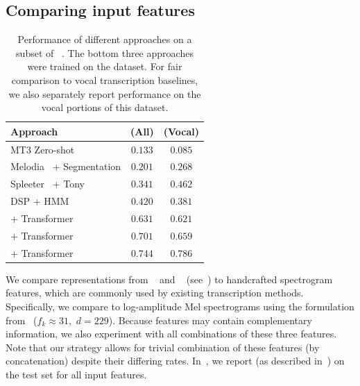 \subsection{Comparing input features}
\label{sec:exp1}

\begin{table}[t]
    \centering
    \begin{tabular}{lcc}
\toprule
Approach & \fone{} (All) & \fone{} (Vocal)\\
\midrule
MT3 Zero-shot~\cite{gardner2021mt3} & $0.133$ & $0.085$ \\
Melodia~\cite{salamon2014melody} + Segmentation & $0.201$ & $0.268$ \\
Spleeter~\cite{hennequin2020spleeter} + Tony~\cite{mauch2015computer} & $0.341$ & $\bm{0.462}$ \\
DSP + HMM~\cite{ryynanen2008automatic} & $\bm{0.420}$ & $0.381$ \\
\midrule
\mel{} + Transformer & $0.631$ & $0.621$ \\
\mtthree{} + Transformer & $0.701$ & $0.659$ \\
\jukebox{} + Transformer & $\mathbf{0.744}$ & $\mathbf{0.786}$ \\
\bottomrule
    \end{tabular}
    \caption{Performance of different approaches on a subset of \rwc~\cite{goto2002rwc,goto2003rwc,goto2004development}. The bottom three approaches were trained on the \hooktheory{} dataset. For fair comparison to vocal transcription baselines, we also separately report performance on the vocal portions of this dataset.}
    \label{tab:rwc_ryy}
\end{table}

We compare representations from \jukebox~\cite{dhariwal2020jukebox} and \mtthree~\cite{gardner2021mt3} (see~) to handcrafted spectrogram features, 
which are commonly used by existing transcription methods.
Specifically, we compare to log-amplitude Mel spectrograms using the formulation from~\cite{hawthorne2017onsets} (${f_k \approx 31}$,~${d = 229}$). 
Because features may contain complementary information, we also experiment with all combinations of these three features. 
Note that our \beatpooling{} strategy allows for trivial combination of these features (by concatenation) despite their differing rates. 
In~, we report \fone{} (as described in~) on the \hooktheory{} test set for all input features.


